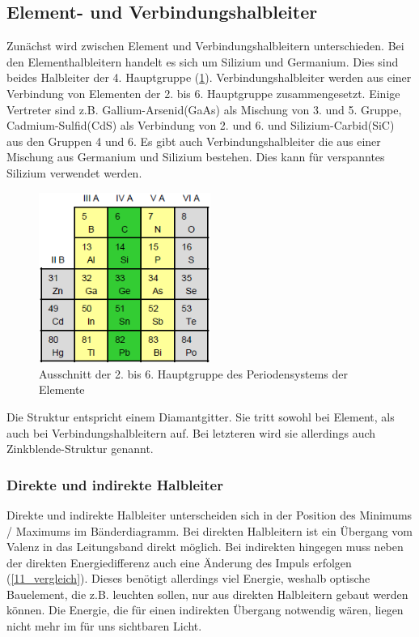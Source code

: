 \subsection{Element- und Verbindungshalbleiter}

	Zunächst wird zwischen Element und Verbindungshalbleitern unterschieden. Bei den Elementhalbleitern handelt es sich um Silizium und Germanium. Dies sind beides Halbleiter der 4. Hauptgruppe (\ref{11_perioden}). Verbindungshalbleiter werden aus einer Verbindung von Elementen der 2. bis 6. Hauptgruppe zusammengesetzt. Einige Vertreter sind z.B. Gallium-Arsenid(GaAs) als Mischung von 3. und 5. Gruppe, Cadmium-Sulfid(CdS) als Verbindung von 2. und 6. und Silizium-Carbid(SiC) aus den Gruppen 4 und 6. Es gibt auch Verbindungshalbleiter die aus einer Mischung aus Germanium und Silizium bestehen. Dies kann für verspanntes Silizium verwendet werden. 

	\begin{figure}[h]
		\centering
		\includegraphics[width=0.5\textwidth]{Kapitel/Kap11/periodensystem.png}
		\caption{Ausschnitt der 2. bis 6. Hauptgruppe des Periodensystems der Elemente}
		\label{11_perioden}
	\end{figure}

	Die Struktur entspricht einem Diamantgitter. Sie tritt sowohl bei Element, als auch bei Verbindungshalbleitern auf. Bei letzteren wird sie allerdings auch Zinkblende-Struktur genannt.

	\subsubsection{Direkte und indirekte Halbleiter}
	Direkte und indirekte Halbleiter unterscheiden sich in der Position des Minimums / Maximums im Bänderdiagramm. Bei direkten Halbleitern ist ein Übergang vom Valenz in das Leitungsband direkt möglich. Bei indirekten hingegen muss neben der direkten Energiedifferenz auch eine Änderung des Impuls erfolgen (\ref{11_vergleich}). Dieses benötigt allerdings viel Energie, weshalb optische Bauelement, die z.B. leuchten sollen, nur aus direkten Halbleitern gebaut werden können. Die Energie, die für einen indirekten Übergang notwendig wären, liegen nicht mehr im für uns sichtbaren Licht.
	
